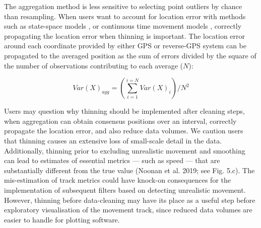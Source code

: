 \documentclass[10pt,paper=a4,headings=standardclasses
]{scrartcl}
\begin{document}
The aggregation method is less sensitive to selecting point outliers by chance than resampling.
When users want to account for location error with methods such as state-space models \citep{jonsen2003, jonsen2005, johnson2008}, or continuous time movement models \citep{fleming2014a, noonan2019, gurarie2017, calabrese2016, fleming2020}, correctly propagating the location error when thinning is important.
The location error around each coordinate provided by either GPS or reverse-GPS system can be propagated to the averaged position as the sum of errors divided by the square of the number of observations contributing to each average ($N$):
\begin{linenomath*}
    \begin{equation*}
        Var(X)_{agg} = \left( \sum_{i=1}^{i=N} Var(X)_i \right) / N ^ 2
    \end{equation*}
\end{linenomath*}

Users may question why thinning should be implemented after cleaning steps, when aggregation can obtain consensus positions over an interval, correctly propagate the location error, and also reduce data volumes.
We caution users that thinning causes an extensive loss of small-scale detail in the data.
Additionally, thinning prior to excluding unrealistic movement and smoothing can lead to estimates of essential metrics --- such as speed --- that are substantially different from the true value (Noonan et al. 2019; see Fig. 5.c).
The mis-estimation of track metrics could have knock-on consequences for the implementation of subsequent filters based on detecting unrealistic movement.
However, thinning before data-cleaning may have its place as a useful step before exploratory visualisation of the movement track, since reduced data volumes are easier to handle for plotting software.
\end{document}
